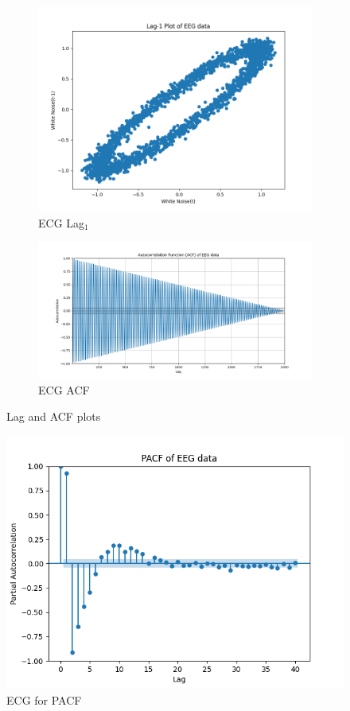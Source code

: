 \documentclass{article}
\begin{document}
\begin{figure}[htbp]
  \centering
  \begin{subfigure}[b]{0.45\textwidth}
    \includegraphics[width=\textwidth]{img/ecg2/ECGlag.png}
    \caption{ECG Lag$_1$}
    \label{fig:ecglag}
  \end{subfigure}
  \hfill
  \begin{subfigure}[b]{0.45\textwidth}
    \includegraphics[width=\textwidth]{img/ecg2/ECGacf.png}
    \caption{ECG ACF}
    \label{fig:ecgacf}
  \end{subfigure}
  \caption{Lag and ACF plots}
  \label{fig:global_temp_dt3}
\end{figure}
\begin{figure}
    \centering \includegraphics[width=0.7\linewidth]{img/ecg2/ECGlpacf.png}
    \caption{ECG for PACF}
    \label{fig:ecgpacf}
    \end{figure}
\end{document}
